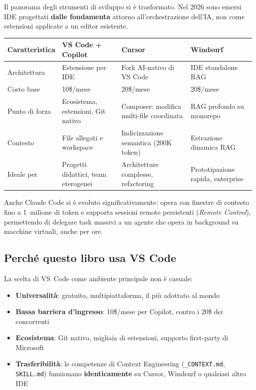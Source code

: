 Il panorama degli strumenti di sviluppo si è trasformato. Nel 2026 sono emersi IDE progettati \textbf{dalle fondamenta} attorno all'orchestrazione dell'IA, non come estensioni applicate a un editor esistente.

\begin{center}
\begin{small}
\begin{tabularx}{\textwidth}{l X X X}
\toprule
\textbf{Caratteristica} & \textbf{VS Code + Copilot} & \textbf{Cursor} & \textbf{Windsurf} \\
\midrule
Architettura & Estensione per IDE & Fork AI-nativo di VS Code & IDE standalone RAG \\
Costo base & 10\$/mese & 20\$/mese & 20\$/mese \\
Punto di forza & Ecosistema, estensioni, Git nativo & Composer: modifica multi-file coordinata & RAG profondo su monorepo \\
Contesto & File allegati e workspace & Indicizzazione semantica (200K token) & Estrazione dinamica RAG \\
Ideale per & Progetti didattici, team eterogenei & Architetture complesse, refactoring & Prototipazione rapida, enterprise \\
\bottomrule
\end{tabularx}
\end{small}
\end{center}

\begin{notebox}
Anche Claude Code si è evoluto significativamente: opera con finestre di contesto fino a 1~milione di token e supporta sessioni remote persistenti (\textit{Remote Control}), permettendo di delegare task massivi a un agente che opera in background su macchine virtuali, anche per ore.
\end{notebox}

\subsection{Perché questo libro usa VS Code}

La scelta di VS~Code come ambiente principale non è casuale:

\begin{itemize}
  \item \textbf{Universalità}: gratuito, multipiattaforma, il più adottato al mondo
  \item \textbf{Bassa barriera d'ingresso}: 10\$/mese per Copilot, contro i 20\$ dei concorrenti
  \item \textbf{Ecosistema}: Git nativo, migliaia di estensioni, supporto first-party di Microsoft
  \item \textbf{Trasferibilità}: le competenze di Context Engineering (\texttt{\_CONTEXT.md}, \texttt{SKILL.md}) funzionano \textbf{identicamente} su Cursor, Windsurf o qualsiasi altro IDE
\end{itemize}

